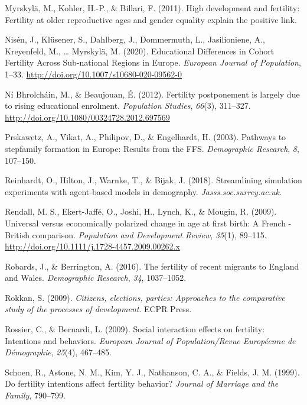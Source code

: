 \documentclass[12pt,twoside]{reedthesis}
\begin{document}
\leavevmode\hypertarget{ref-myrskyla2011a}{}%
Myrskylä, M., Kohler, H.-P., \& Billari, F. (2011). High development and fertility: Fertility at older reproductive ages and gender equality explain the positive link.

\leavevmode\hypertarget{ref-nisen2020}{}%
Nisén, J., Klüsener, S., Dahlberg, J., Dommermuth, L., Jasilioniene, A., Kreyenfeld, M., \ldots{} Myrskylä, M. (2020). Educational Differences in Cohort Fertility Across Sub-national Regions in Europe. \emph{European Journal of Population}, 1--33. \url{http://doi.org/10.1007/s10680-020-09562-0}

\leavevmode\hypertarget{ref-nibhrolchain2012}{}%
Ní Bhrolcháin, M., \& Beaujouan, É. (2012). Fertility postponement is largely due to rising educational enrolment. \emph{Population Studies}, \emph{66}(3), 311--327. \url{http://doi.org/10.1080/00324728.2012.697569}

\leavevmode\hypertarget{ref-prskawetz2003}{}%
Prskawetz, A., Vikat, A., Philipov, D., \& Engelhardt, H. (2003). Pathways to stepfamily formation in Europe: Results from the FFS. \emph{Demographic Research}, \emph{8}, 107--150.

\leavevmode\hypertarget{ref-reinhardt2018}{}%
Reinhardt, O., Hilton, J., Warnke, T., \& Bijak, J. (2018). Streamlining simulation experiments with agent-based models in demography. \emph{Jasss.soc.surrey.ac.uk}.

\leavevmode\hypertarget{ref-rendall2009}{}%
Rendall, M. S., Ekert-Jaffé, O., Joshi, H., Lynch, K., \& Mougin, R. (2009). Universal versus economically polarized change in age at first birth: A French - British comparison. \emph{Population and Development Review}, \emph{35}(1), 89--115. \url{http://doi.org/10.1111/j.1728-4457.2009.00262.x}

\leavevmode\hypertarget{ref-robards2016}{}%
Robards, J., \& Berrington, A. (2016). The fertility of recent migrants to England and Wales. \emph{Demographic Research}, \emph{34}, 1037--1052.

\leavevmode\hypertarget{ref-rokkan2009}{}%
Rokkan, S. (2009). \emph{Citizens, elections, parties: Approaches to the comparative study of the processes of development}. ECPR Press.

\leavevmode\hypertarget{ref-rossier2009}{}%
Rossier, C., \& Bernardi, L. (2009). Social interaction effects on fertility: Intentions and behaviors. \emph{European Journal of Population/Revue Européenne de Démographie}, \emph{25}(4), 467--485.

\leavevmode\hypertarget{ref-schoen1999b}{}%
Schoen, R., Astone, N. M., Kim, Y. J., Nathanson, C. A., \& Fields, J. M. (1999). Do fertility intentions affect fertility behavior? \emph{Journal of Marriage and the Family}, 790--799.
\end{document}

